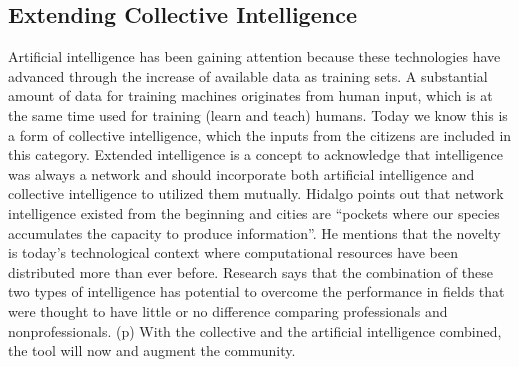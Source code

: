 \subsection{Extending Collective Intelligence}
Artificial intelligence has been gaining attention because these technologies have advanced through the increase of available data as training sets. A substantial amount of data for training machines originates from human input, which is at the same time used for training (learn and teach) humans. Today we know this is a form of collective intelligence, which the inputs from the citizens are included in this category. Extended intelligence is a concept to acknowledge that intelligence was always a network and should incorporate both artificial intelligence and collective intelligence to utilized them mutually.\cite{pubpub:extended} Hidalgo points out that network intelligence existed from the beginning and cities are ``pockets where our species accumulates the capacity to produce information''.\cite{hidalgo2015information} He mentions that the novelty is today's technological context where computational resources have been distributed more than ever before.\cite{pubpub:whatsnew} Research says that the combination of these two types of intelligence has potential to overcome the performance\cite{baharad2011distilling} in fields that were thought to have little or no difference comparing professionals and nonprofessionals. (p\pageref{subsec:wicked}) With the collective and the artificial intelligence combined, the tool will now  and augment the community.